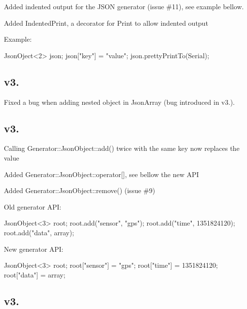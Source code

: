 \begin{DoxyItemize}
\item Added indented output for the J\+S\+O\+N generator (issue \#11), see example bellow.
\item Added {\ttfamily Indented\+Print}, a decorator for {\ttfamily Print} to allow indented output
\end{DoxyItemize}

Example\+: \begin{DoxyVerb}JsonOject<2> json;
json["key"] = "value";
json.prettyPrintTo(Serial);
\end{DoxyVerb}


\subsection*{v3. }


\begin{DoxyItemize}
\item Fixed a bug when adding nested object in {\ttfamily Json\+Array} (bug introduced in v3.).
\end{DoxyItemize}

\subsection*{v3. }


\begin{DoxyItemize}
\item Calling {\ttfamily Generator\+::\+Json\+Object\+::add()} twice with the same {\ttfamily key} now replaces the {\ttfamily value}
\item Added {\ttfamily Generator\+::\+Json\+Object\+::operator\mbox{[}\mbox{]}}, see bellow the new A\+P\+I
\item Added {\ttfamily Generator\+::\+Json\+Object\+::remove()} (issue \#9)
\end{DoxyItemize}

Old generator A\+P\+I\+: \begin{DoxyVerb}JsonObject<3> root; 
root.add("sensor", "gps");
root.add("time", 1351824120);
root.add("data", array);
\end{DoxyVerb}


New generator A\+P\+I\+: \begin{DoxyVerb}JsonObject<3> root; 
root["sensor"] = "gps";
root["time"] = 1351824120;
root["data"] = array;
\end{DoxyVerb}


\subsection*{v3. }



